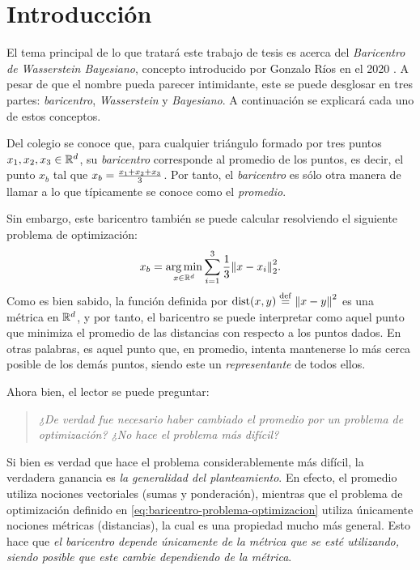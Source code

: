 \chapter{Introducción}

El tema principal de lo que tratará este trabajo de tesis es acerca del \emph{Baricentro de Wasserstein Bayesiano}, concepto introducido por Gonzalo Ríos en el 2020 \cite{rios2020contributions}. A pesar de que el nombre pueda parecer intimidante, este se puede desglosar en tres partes: \emph{baricentro}, \emph{Wasserstein} y \emph{Bayesiano}. A continuación se explicará cada uno de estos conceptos.

Del colegio se conoce que, para cualquier triángulo formado por tres puntos $x_1, x_2, x_3 \in \mathbb{R}^d$, su \emph{baricentro} corresponde al promedio de los puntos, es decir, el punto $x_b$ tal que $x_b =\nolinebreak \frac{x_1 + x_2 + x_3}{3}$. Por tanto, el \emph{baricentro} es sólo otra manera de llamar a lo que típicamente se conoce como el \emph{promedio}.

Sin embargo, este baricentro también se puede calcular resolviendo el siguiente problema de optimización:
\begin{equation}\label{eq:baricentro-problema-optimizacion}
    x_b = \operatorname*{arg\,m{i}n}_{x \in \mathbb{R}^d} \sum_{i=1}^3 \frac{1}{3} \norm{x - x_i}_2^2.
\end{equation}
Como es bien sabido, la función definida por $\operatorname{dist}(x, y) \stackrel{\mathrm{def}}{=} \norm{x - y}^2$ es una métrica en $\mathbb{R}^d$, y por tanto, el baricentro se puede interpretar como aquel punto que minimiza el promedio de las distancias con respecto a los puntos dados. En otras palabras, es aquel punto que, en promedio, intenta mantenerse lo más cerca posible de los demás puntos, siendo este un \emph{representante} de todos ellos.

Ahora bien, el lector se puede preguntar:
\begin{quotation}
    \textit{¿De verdad fue necesario haber cambiado el promedio por un problema de optimización? ¿No hace el problema más difícil?}
\end{quotation}
Si bien es verdad que hace el problema considerablemente más difícil, la verdadera ganancia es \emph{la generalidad del planteamiento}. En efecto, el promedio utiliza nociones vectoriales (sumas y ponderación), mientras que el problema de optimización definido en \eqref{eq:baricentro-problema-optimizacion} utiliza únicamente nociones métricas (distancias), la cual es una propiedad mucho más general. Esto hace que \emph{el baricentro depende únicamente de la métrica que se esté utilizando, siendo posible que este cambie dependiendo de la métrica}.

